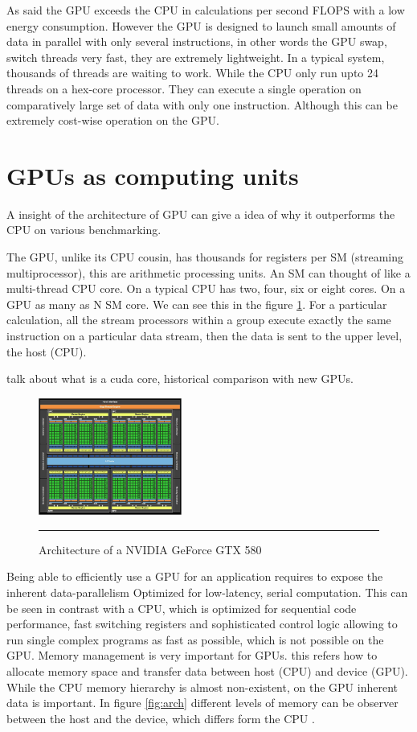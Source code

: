 As said the GPU exceeds the CPU in calculations per second FLOPS with a low energy consumption. However the GPU is designed to launch small amounts of data in parallel with only several instructions, in other words the GPU swap, switch threads very fast, they are extremely lightweight. In a typical system, thousands of threads are waiting to work. While the CPU only run upto 24 threads on a hex-core processor. They can execute a single operation on comparatively large set of data with only one instruction. Although this can be extremely cost-wise operation on the GPU.

\section{GPUs as computing units}

A insight of the architecture of GPU can give a idea of  why it outperforms the CPU on various benchmarking.

The GPU, unlike its CPU cousin, has thousands for registers per SM (streaming multiprocessor), this are  arithmetic processing units. An SM can thought of like a multi-thread CPU core. On a typical CPU has two, four, six or eight cores. On a GPU as many as N SM core. We can see this in the figure \ref{fig:gpu_cpu}. For a particular calculation, all the stream
processors within a group execute exactly the same instruction on a particular data stream, then the data is sent to the upper level, the host (CPU). \cite{cook}

talk about what is a cuda core, historical comparison with new GPUs.

\begin{figure}[htbp]
	\centering
		\includegraphics[width=0.42\textwidth]{Figures/GPU_CPU.png}
		\rule{35em}{0.5pt}
	\caption[Architecture of a GPU]{Architecture of a NVIDIA GeForce GTX 580}
	\label{fig:gpu_cpu}
\end{figure}

Being able to efficiently use a GPU for an application requires to expose the inherent data-parallelism Optimized for low-latency, serial computation. This can be seen in contrast with a CPU, which is optimized for sequential code performance, fast switching registers  and sophisticated control logic allowing to run single complex programs as fast as possible, which is not possible on the GPU. Memory management is very important for GPUs. this refers how to allocate memory space and transfer data between host (CPU) and device (GPU). While the CPU memory hierarchy is almost non-existent, on the GPU inherent data is important. In figure \ref{fig:arch} different levels of memory can be observer between the host and the device, which differs form the CPU \cite{hwu}.

